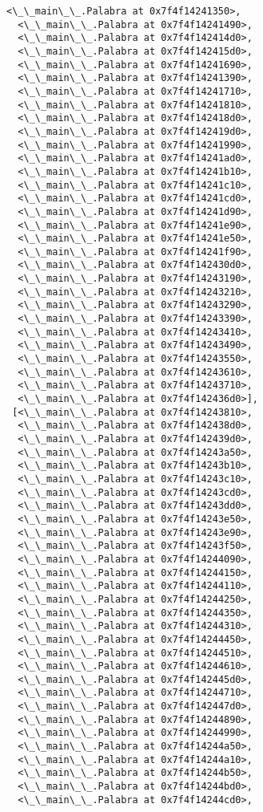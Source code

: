 \documentclass[12pt,a4paper,table]{article}
\begin{document}
\begin{tcolorbox}[breakable, size=fbox, boxrule=.5pt, pad at break*=1mm, opacityfill=0]
\begin{Verbatim}[commandchars=\\\{\}]
  <\_\_main\_\_.Palabra at 0x7f4f14241350>,
  <\_\_main\_\_.Palabra at 0x7f4f14241490>,
  <\_\_main\_\_.Palabra at 0x7f4f142414d0>,
  <\_\_main\_\_.Palabra at 0x7f4f142415d0>,
  <\_\_main\_\_.Palabra at 0x7f4f14241690>,
  <\_\_main\_\_.Palabra at 0x7f4f14241390>,
  <\_\_main\_\_.Palabra at 0x7f4f14241710>,
  <\_\_main\_\_.Palabra at 0x7f4f14241810>,
  <\_\_main\_\_.Palabra at 0x7f4f142418d0>,
  <\_\_main\_\_.Palabra at 0x7f4f142419d0>,
  <\_\_main\_\_.Palabra at 0x7f4f14241990>,
  <\_\_main\_\_.Palabra at 0x7f4f14241ad0>,
  <\_\_main\_\_.Palabra at 0x7f4f14241b10>,
  <\_\_main\_\_.Palabra at 0x7f4f14241c10>,
  <\_\_main\_\_.Palabra at 0x7f4f14241cd0>,
  <\_\_main\_\_.Palabra at 0x7f4f14241d90>,
  <\_\_main\_\_.Palabra at 0x7f4f14241e90>,
  <\_\_main\_\_.Palabra at 0x7f4f14241e50>,
  <\_\_main\_\_.Palabra at 0x7f4f14241f90>,
  <\_\_main\_\_.Palabra at 0x7f4f142430d0>,
  <\_\_main\_\_.Palabra at 0x7f4f14243190>,
  <\_\_main\_\_.Palabra at 0x7f4f14243210>,
  <\_\_main\_\_.Palabra at 0x7f4f14243290>,
  <\_\_main\_\_.Palabra at 0x7f4f14243390>,
  <\_\_main\_\_.Palabra at 0x7f4f14243410>,
  <\_\_main\_\_.Palabra at 0x7f4f14243490>,
  <\_\_main\_\_.Palabra at 0x7f4f14243550>,
  <\_\_main\_\_.Palabra at 0x7f4f14243610>,
  <\_\_main\_\_.Palabra at 0x7f4f14243710>,
  <\_\_main\_\_.Palabra at 0x7f4f142436d0>],
 [<\_\_main\_\_.Palabra at 0x7f4f14243810>,
  <\_\_main\_\_.Palabra at 0x7f4f142438d0>,
  <\_\_main\_\_.Palabra at 0x7f4f142439d0>,
  <\_\_main\_\_.Palabra at 0x7f4f14243a50>,
  <\_\_main\_\_.Palabra at 0x7f4f14243b10>,
  <\_\_main\_\_.Palabra at 0x7f4f14243c10>,
  <\_\_main\_\_.Palabra at 0x7f4f14243cd0>,
  <\_\_main\_\_.Palabra at 0x7f4f14243dd0>,
  <\_\_main\_\_.Palabra at 0x7f4f14243e50>,
  <\_\_main\_\_.Palabra at 0x7f4f14243e90>,
  <\_\_main\_\_.Palabra at 0x7f4f14243f50>,
  <\_\_main\_\_.Palabra at 0x7f4f14244090>,
  <\_\_main\_\_.Palabra at 0x7f4f14244150>,
  <\_\_main\_\_.Palabra at 0x7f4f14244110>,
  <\_\_main\_\_.Palabra at 0x7f4f14244250>,
  <\_\_main\_\_.Palabra at 0x7f4f14244350>,
  <\_\_main\_\_.Palabra at 0x7f4f14244310>,
  <\_\_main\_\_.Palabra at 0x7f4f14244450>,
  <\_\_main\_\_.Palabra at 0x7f4f14244510>,
  <\_\_main\_\_.Palabra at 0x7f4f14244610>,
  <\_\_main\_\_.Palabra at 0x7f4f142445d0>,
  <\_\_main\_\_.Palabra at 0x7f4f14244710>,
  <\_\_main\_\_.Palabra at 0x7f4f142447d0>,
  <\_\_main\_\_.Palabra at 0x7f4f14244890>,
  <\_\_main\_\_.Palabra at 0x7f4f14244990>,
  <\_\_main\_\_.Palabra at 0x7f4f14244a50>,
  <\_\_main\_\_.Palabra at 0x7f4f14244a10>,
  <\_\_main\_\_.Palabra at 0x7f4f14244b50>,
  <\_\_main\_\_.Palabra at 0x7f4f14244bd0>,
  <\_\_main\_\_.Palabra at 0x7f4f14244cd0>,

\end{Verbatim}
\end{tcolorbox}
\end{document}
